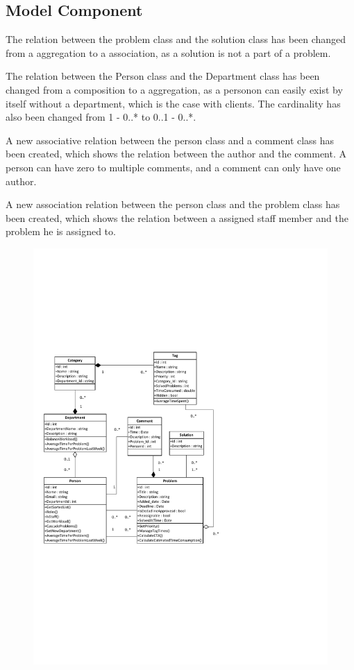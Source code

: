 \subsection*{Model Component}
The relation between the problem class and the solution class has been changed from a aggregation to a association, as a solution is not a part of a problem.

The relation between the Person class and the Department class has been changed from a composition to a aggregation, as a personon can easily exist by itself without a department, which is the case with clients. The cardinality has also been changed from 1 - 0..* to 0..1 - 0..*.

A new associative relation between the person class and a comment class has been created, which shows the relation between the author and the comment. A person can have zero to multiple comments, and a comment can only have one author.

A new association relation between the person class and the problem class has been created, which shows the relation between a assigned staff member and the problem he is assigned to.	

\begin{figure}[p]%
\includegraphics[clip=true, height=1.0\textwidth, trim=0.5cm 5cm 7.5cm 7cm]{ClassDiagramV3.pdf}%
\label{fig:modelcomponent}
\end{figure}

